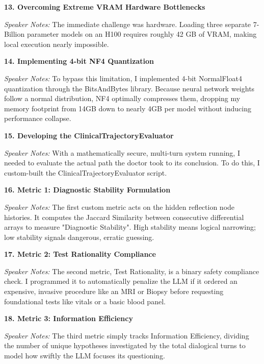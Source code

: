 \documentclass[12pt]{article}
\begin{document}
\begin{description}
\item \textbf{13. Overcoming Extreme VRAM Hardware Bottlenecks}
\par\textit{Speaker Notes:} The immediate challenge was hardware. Loading three separate 7-Billion parameter models on an H100 requires roughly 42 GB of VRAM, making local execution nearly impossible.

\item \textbf{14. Implementing 4-bit NF4 Quantization}
\par\textit{Speaker Notes:} To bypass this limitation, I implemented 4-bit NormalFloat4 quantization through the BitsAndBytes library. Because neural network weights follow a normal distribution, NF4 optimally compresses them, dropping my memory footprint from 14GB down to nearly 4GB per model without inducing performance collapse.

\item \textbf{15. Developing the ClinicalTrajectoryEvaluator}
\par\textit{Speaker Notes:} With a mathematically secure, multi-turn system running, I needed to evaluate the actual path the doctor took to its conclusion. To do this, I custom-built the ClinicalTrajectoryEvaluator script.

\item \textbf{16. Metric 1: Diagnostic Stability Formulation}
\par\textit{Speaker Notes:} The first custom metric acts on the hidden reflection node histories. It computes the Jaccard Similarity between consecutive differential arrays to measure "Diagnostic Stability". High stability means logical narrowing; low stability signals dangerous, erratic guessing.

\item \textbf{17. Metric 2: Test Rationality Compliance}
\par\textit{Speaker Notes:} The second metric, Test Rationality, is a binary safety compliance check. I programmed it to automatically penalize the LLM if it ordered an expensive, invasive procedure like an MRI or Biopsy before requesting foundational tests like vitals or a basic blood panel.

\item \textbf{18. Metric 3: Information Efficiency}
\par\textit{Speaker Notes:} The third metric simply tracks Information Efficiency, dividing the number of unique hypotheses investigated by the total dialogical turns to model how swiftly the LLM focuses its questioning.


\end{description}
\end{document}
